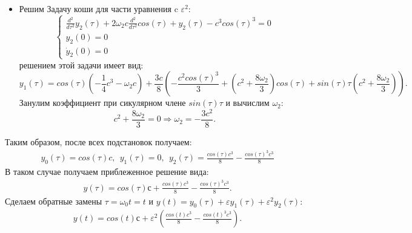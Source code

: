 \documentclass[12pt]{article}
\begin{document}
\begin{itemize}
\begin{itemize}
            \item Решим Задачу коши для части уравнения c $\varepsilon^2$:
            \begin{equation*}
                \begin{cases}
                    \frac{d^2}{d\tau^2}y_2(\tau) + 2\omega_2c\frac{d^2}{d\tau^2}cos(\tau) + y_2(\tau) - c^3cos(\tau)^3 = 0 \\
                    y_2(0)=0\\
                    \dot y_2(0)=0
                \end{cases}
            \end{equation*}
            решением этой задачи имеет вид: $$y_1(\tau) = cos(\tau)\left(-\frac{1}{4}c^3 - \omega_2c\right) + 
            \frac{3c}{8}\left(-\frac{c^2cos(\tau)^3}{3} + \left(c^2 + \frac{8\omega_2}{3}\right)cos(\tau) + 
            sin(\tau)\tau\left(c^2 + \frac{8\omega_2}{3}\right)\right).$$
            Занулим коэффициент при сикулярном члене $sin(\tau)\tau$ и вычислим $\omega_2$:
            $$c^2 + \frac{8\omega_2}{3}=0 \Rightarrow \omega_2=-\frac{3c^2}{8}.$$
        \end{itemize}
        Таким образом, после всех подстановок получаем:
        \begin{eqnarray}
            y_0(\tau)=cos(\tau)c,\:\:y_1(\tau)=0,\:\:y_2(\tau)=\frac{cos(\tau)c^3}{8} - \frac{cos(\tau)^3c^3}{8}
        \end{eqnarray}
        В таком случае получаем приблеженное решение вида:
        \begin{eqnarray}
            y(\tau)=cos(\tau)с+\frac{cos(\tau)c^3}{8} - \frac{cos(\tau)^3c^3}{8}.
        \end{eqnarray}
        Сделаем обратные замены $\tau=\omega_0t=t$ и $y(t)=y_0(\tau)+\varepsilon y_1(\tau)+\varepsilon^2y_2(\tau)$:
        \begin{eqnarray}
            y(t)=cos(t)с+\varepsilon^2\left(\frac{cos(t)c^3}{8} - \frac{cos(t)^3c^3}{8}\right).
        \end{eqnarray}
        \newpage


\end{itemize}
\end{document}
